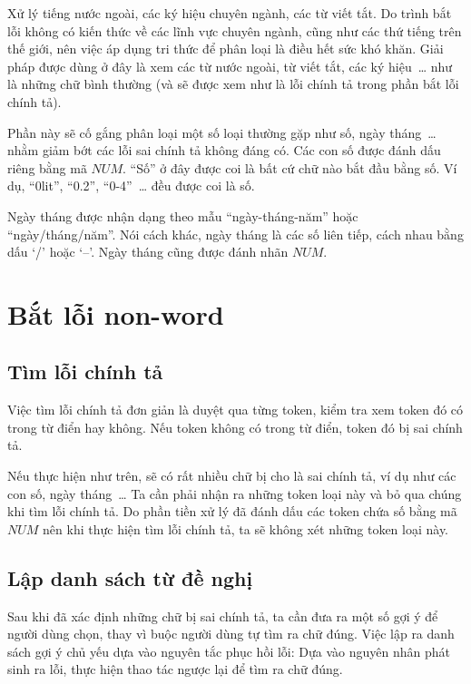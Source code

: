 \documentclass[a4paper,oneside,14pt]{extbook} %
\begin{document}
Xử lý tiếng nước ngoài, các ký hiệu chuyên ngành, các từ viết tắt. Do
trình bắt lỗi không có kiến thức về các lĩnh vực chuyên 
ngành, cũng như các thứ tiếng trên thế giới, nên việc áp dụng tri thức
để phân loại là điều hết sức khó khăn.  Giải pháp được dùng ở đây là
xem các từ nước ngoài, từ viết tắt, các ký hiệu~\ldots{} như là 
những chữ bình thường (và sẽ được xem như là lỗi chính tả trong phần
bắt lỗi chính tả).

Phần này sẽ cố gắng phân loại một số loại thường gặp như số, ngày
tháng~\ldots{} nhằm giảm bớt các lỗi sai chính tả không đáng có. Các
con số được đánh dấu riêng bằng mã $NUM$. ``Số'' ở đây được coi là bất
cứ chữ nào bắt đầu bằng số. Ví dụ, ``0lit'', ``0.2'',
``0-4''~\ldots{}{} đều được coi là số. 

Ngày tháng được nhận dạng theo mẫu ``ngày-tháng-năm'' hoặc
``ngày/tháng/năm''. Nói cách khác, ngày tháng là các số liên tiếp,
cách nhau bằng dấu `/' hoặc `--'. Ngày tháng cũng được đánh nhãn $NUM$.


\section{Bắt lỗi non-word}


\subsection{Tìm lỗi chính tả}
\label{sec:nonword:spelling-checking}

Việc tìm lỗi chính tả đơn giản là duyệt qua từng token, kiểm tra xem
token đó có trong từ điển hay không. Nếu token không có trong từ điển,
token đó bị sai chính tả.

Nếu thực hiện như trên, sẽ có rất nhiều chữ bị cho là sai chính tả, ví
dụ như các con số, ngày tháng~\ldots{} Ta cần phải nhận ra những token
loại này và bỏ qua chúng khi tìm lỗi chính tả. Do phần tiền xử lý đã
đánh dấu các token chứa số bằng mã $NUM$ nên khi thực hiện tìm lỗi
chính tả, ta sẽ không xét những token loại này.


\subsection{Lập danh sách từ đề nghị}
\label{sec:nonword:candidate-list}

Sau khi đã xác định những chữ bị sai chính tả, ta cần đưa ra một số
gợi ý để người dùng chọn, thay vì buộc người dùng tự tìm ra chữ
đúng. Việc lập ra danh sách gợi ý chủ yếu dựa vào nguyên tắc phục hồi
lỗi: Dựa vào nguyên nhân phát sinh ra lỗi, thực hiện thao tác ngược
lại để tìm ra chữ đúng.
\end{document}
